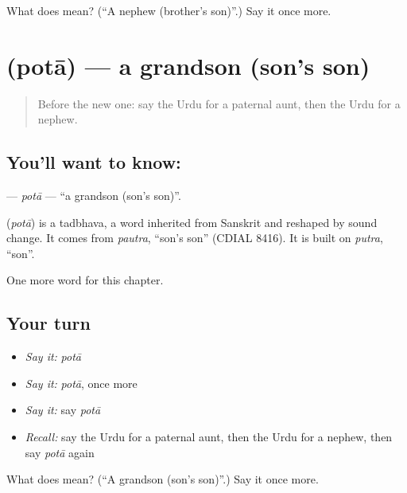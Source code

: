 \begin{tcolorbox}[breakable,colback=teal!4,colframe=teal!35!black,title={Before you move on}]
What does  mean? (\textquotedblleft{}A nephew (brother's son)\textquotedblright{}.) Say it once more.
\end{tcolorbox}
\section[\texorpdfstring{\ur{پوتا} (potā)}{پوتا (potā)}]{ (potā) — a grandson (son's son)}

\label{lesson:UR-C203-pota}



\begin{quote}
Before the new one: say the Urdu for a paternal aunt, then the Urdu for a nephew.
\end{quote}

\subsection*{You'll want to know: }
\textbf{} — \emph{potā} — \textquotedblleft{}a grandson (son's son)\textquotedblright{}.

\begin{cousinweb}
\textbf{} (\emph{potā}) is a tadbhava, a word inherited from Sanskrit and reshaped by sound change. It comes from \emph{pautra}, \textquotedblleft{}son's son\textquotedblright{} (CDIAL 8416). It is built on \emph{putra}, \textquotedblleft{}son\textquotedblright{}.
\end{cousinweb}

\begin{grammarlens}[title={What you've built}]
One more word for this chapter.
\end{grammarlens}

\subsection*{Your turn}
\begin{itemize}
\raggedright
  \item \emph{Say it:} \emph{potā}
  \item \emph{Say it:} \emph{potā}, once more
  \item \emph{Say it:} say \emph{potā}
  \item \emph{Recall:} say the Urdu for a paternal aunt, then the Urdu for a nephew, then say \emph{potā} again
\end{itemize}

\begin{tcolorbox}[breakable,colback=teal!4,colframe=teal!35!black,title={Before you move on}]
What does  mean? (\textquotedblleft{}A grandson (son's son)\textquotedblright{}.) Say it once more.
\end{tcolorbox}
